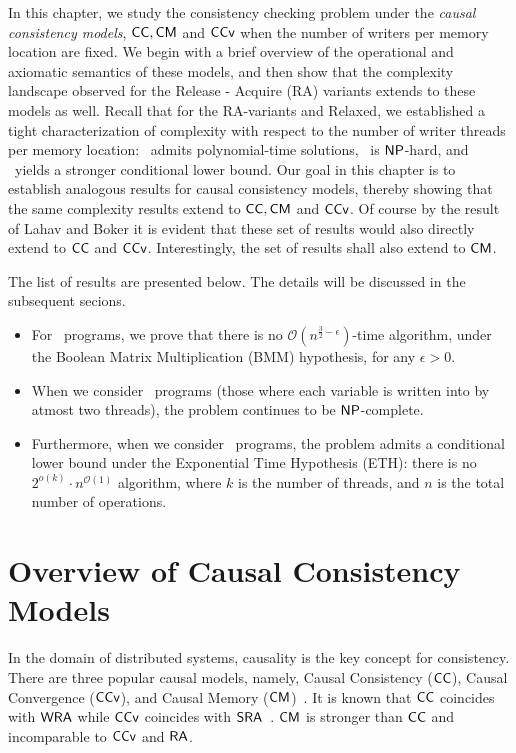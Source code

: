 In this chapter, we study the consistency checking problem under the \emph{causal consistency models}, $\mathsf{CC}, \mathsf{CM}$ and $\mathsf{CCv}$ when the number of writers per memory location are fixed. 
We begin with a brief overview of the operational and axiomatic semantics of these models, and then show that the complexity landscape observed for the Release - Acquire (RA) variants extends to these models as well. 
Recall that for the RA-variants  and Relaxed, we established a tight characterization of complexity with respect to the number of writer threads per memory location:
\onewriter\ admits polynomial-time solutions, \twowriter\ is $\mathsf{NP}$-hard, and \threewriter\ yields a stronger conditional lower bound. Our goal in this chapter is to establish analogous results for causal consistency models, thereby showing that the same complexity results extend to $\mathsf{CC}, \mathsf{CM}$ and $\mathsf{CCv}$. Of course by the result of Lahav and Boker \cite{Lahav2021} it is evident that these set of results would also directly extend to $\mathsf{CC}$ and $\mathsf{CCv}$. Interestingly, the set of results shall also extend to $\mathsf{CM}$.

The list of results are presented below. The details will be discussed in the subsequent secions.

\begin{itemize}
\item For \onewriter\ programs, we prove that there is no $\mathcal{O}(n^{\frac{3}{2} - \epsilon})$-time algorithm, under the Boolean Matrix Multiplication (BMM) hypothesis, for any $\epsilon > 0$. 
\item When we consider \twowriter\ programs (those where each variable is written into by atmost two threads), the problem continues to be $\mathsf{NP}$-complete. 
\item Furthermore, when we consider \threewriter\ programs, the problem admits a conditional lower bound under the Exponential Time Hypothesis (ETH): there is no $2^{o(k)} \cdot n^{\mathcal{O}(1)}$ algorithm, where $k$ is the number of threads, and $n$ is the total number of operations.
\end{itemize}


\section{Overview of Causal Consistency Models}
\label{app:cc-models-overview}

In the domain of distributed systems, causality is the key concept for consistency. There are three popular causal models, namely, Causal Consistency ($\mathsf{CC}$), Causal Convergence ($\mathsf{CCv}$), and Causal Memory ($\mathsf{CM}$)~\cite{BouajjaniEGH17}. 
It is known that $\mathsf{CC}$ coincides with $\mathsf{WRA}$ while $\mathsf{CCv}$ coincides with $\mathsf{SRA}$~\cite{Lahav:2022}. $\mathsf{CM}$ is stronger than $\mathsf{CC}$ and incomparable to $\mathsf{CCv}$ and $\mathsf{RA}$.  


